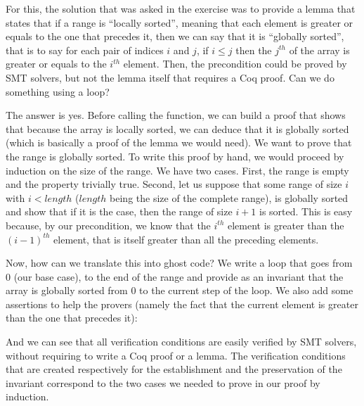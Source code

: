 


For this, the solution that was asked in the exercise was to provide a lemma
that states that if a range is ``locally sorted'', meaning that each element
is greater or equals to the one that precedes it, then we can say that it is
``globally sorted'', that is to say for each pair of indices $i$ and $j$, if
$i \leq j$ then the $j^{th}$ of the array is greater or equals to the $i^{th}$
element. Then, the precondition could be proved by SMT solvers, but not the
lemma itself that requires a Coq proof. Can we do something using a loop?



The answer is yes. Before calling the function, we can build a proof that
shows that because the array is locally sorted, we can deduce that it is
globally sorted (which is basically a proof of the lemma we would need).
We want to prove that the range is globally sorted. To write this proof by hand,
we would proceed by induction on the size of the range. We have two cases.
First, the range is empty and the property trivially true. Second, let us suppose
that some range of size $i$ with $i < length$ ($length$ being the size of the
complete range), is globally sorted and show that if it is the case, then the
range of size $i+1$ is sorted. This is easy because, by our precondition, we
know that the $i^{th}$ element is greater than the $(i-1)^{th}$ element, that is
itself greater than all the preceding elements.




Now, how can we translate this into ghost code? We write a loop that goes from
$0$ (our base case), to the end of the range  and provide as an
invariant that the array is globally sorted from $0$ to the current step of the
loop. We also add some assertions to help the provers (namely the fact that the
current element is greater than the one that precedes it):






And we can see that all verification conditions are easily verified by SMT
solvers, without requiring to write a Coq proof or a lemma. The verification
conditions that are created respectively for the establishment and the preservation
of the invariant correspond to the two cases we needed to prove in our proof
by induction.


